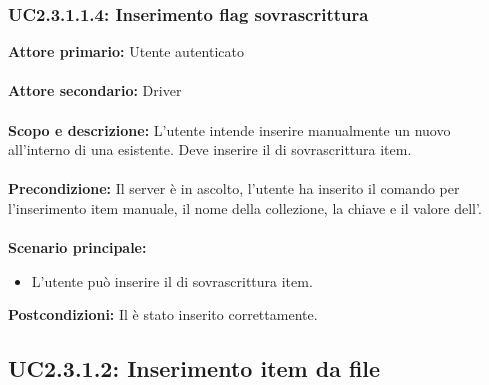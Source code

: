 \documentclass{scalatekids-article}
\begin{document}
\subsubsection{UC2.3.1.1.4: Inserimento flag sovrascrittura}

\textbf{Attore primario:} Utente autenticato\\ \\
\textbf{Attore secondario:} Driver\\ \\
\textbf{Scopo e descrizione:} L'utente intende inserire manualmente un nuovo  all'interno di una  esistente. Deve inserire il  di sovrascrittura item.\\ \\
\textbf{Precondizione:} Il server è in ascolto, l'utente ha inserito il comando per l'inserimento item manuale, il nome della collezione, la chiave e il valore dell'.\\ \\
\textbf{Scenario principale:}
\begin{itemize}
  \item L'utente può inserire il  di sovrascrittura item. %
\end{itemize}
\textbf{Postcondizioni:} Il  è stato inserito correttamente.

\subsection{UC2.3.1.2: Inserimento item da file}
\end{document}
